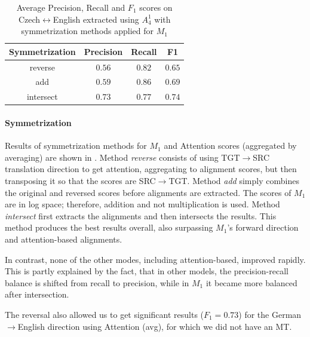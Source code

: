\begin{table}[h!]
    \center
    \begin{tabular}{cccc}
        \toprule
        Symmetrization & Precision & Recall & F1 \\
        \midrule
        reverse & $0.56$ & $0.82$ & $0.65$ \\
        add & $0.59$ & $0.86$ & $0.69$ \\
        intersect & $0.73$ & $0.77$ & $0.74$ \\
        \bottomrule
    \end{tabular}
    \caption{Average Precision, Recall and $F_1$ scores on Czech$\leftrightarrow$English extracted using $A_4^1$ with symmetrization methods applied for $M_1$ \label{tab:individual_symmetry}}
\end{table}

\paragraph{Symmetrization} Results of symmetrization methods for $M_1$ and Attention scores (aggregated by averaging) are shown in . Method \textit{reverse} consists of using TGT$\rightarrow$SRC translation direction to get attention, aggregating to alignment scores, but then transposing it so that the scores are SRC$\rightarrow$TGT. Method \textit{add} simply combines the original and reversed scores before alignments are extracted. The scores of $M_1$ are in log space; therefore, addition and not multiplication is used. Method \textit{intersect} first extracts the alignments and then intersects the results. This method produces the best results overall, also surpassing $M_1$'s forward direction and attention-based alignments.

In contrast, none of the other modes, including attention-based, improved rapidly. This is partly explained by the fact, that in other models, the precision-recall balance is shifted from recall to precision, while in $M_1$ it became more balanced after intersection.

The reversal also allowed us to get significant results ($F_1 = 0.73$) for the German$\rightarrow$English direction using Attention (avg), for which we did not have an MT.

